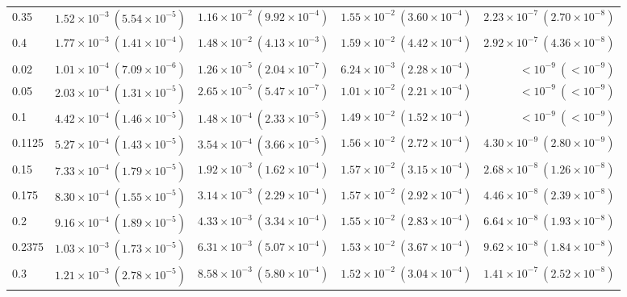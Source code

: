 \begin{table}[htbp]
\begin{tabular}{@{} l rrrr @{}}
0.35 & $1.52\!\times\!10^{-3}\ (5.54\!\times\!10^{-5})$ & $1.16\!\times\!10^{-2}\ (9.92\!\times\!10^{-4})$ & $1.55\!\times\!10^{-2}\ (3.60\!\times\!10^{-4})$ & $2.23\!\times\!10^{-7}\ (2.70\!\times\!10^{-8})$ \\
0.4 & $1.77\!\times\!10^{-3}\ (1.41\!\times\!10^{-4})$ & $1.48\!\times\!10^{-2}\ (4.13\!\times\!10^{-3})$ & $1.59\!\times\!10^{-2}\ (4.42\!\times\!10^{-4})$ & $2.92\!\times\!10^{-7}\ (4.36\!\times\!10^{-8})$ \\
\addlinespace
\multicolumn{5}{@{}l}{\textit{Medium ($p \sim \mathcal{U}(0.1125, 0.2375)$)}} \\
0.02 & $1.01\!\times\!10^{-4}\ (7.09\!\times\!10^{-6})$ & $1.26\!\times\!10^{-5}\ (2.04\!\times\!10^{-7})$ & $6.24\!\times\!10^{-3}\ (2.28\!\times\!10^{-4})$ & $<\!10^{-9}\ (<\!10^{-9})$ \\
0.05 & $2.03\!\times\!10^{-4}\ (1.31\!\times\!10^{-5})$ & $2.65\!\times\!10^{-5}\ (5.47\!\times\!10^{-7})$ & $1.01\!\times\!10^{-2}\ (2.21\!\times\!10^{-4})$ & $<\!10^{-9}\ (<\!10^{-9})$ \\
0.1 & $4.42\!\times\!10^{-4}\ (1.46\!\times\!10^{-5})$ & $1.48\!\times\!10^{-4}\ (2.33\!\times\!10^{-5})$ & $1.49\!\times\!10^{-2}\ (1.52\!\times\!10^{-4})$ & $<\!10^{-9}\ (<\!10^{-9})$ \\
0.1125 & $5.27\!\times\!10^{-4}\ (1.43\!\times\!10^{-5})$ & $3.54\!\times\!10^{-4}\ (3.66\!\times\!10^{-5})$ & $1.56\!\times\!10^{-2}\ (2.72\!\times\!10^{-4})$ & $4.30\!\times\!10^{-9}\ (2.80\!\times\!10^{-9})$ \\
0.15 & $7.33\!\times\!10^{-4}\ (1.79\!\times\!10^{-5})$ & $1.92\!\times\!10^{-3}\ (1.62\!\times\!10^{-4})$ & $1.57\!\times\!10^{-2}\ (3.15\!\times\!10^{-4})$ & $2.68\!\times\!10^{-8}\ (1.26\!\times\!10^{-8})$ \\
0.175 & $8.30\!\times\!10^{-4}\ (1.55\!\times\!10^{-5})$ & $3.14\!\times\!10^{-3}\ (2.29\!\times\!10^{-4})$ & $1.57\!\times\!10^{-2}\ (2.92\!\times\!10^{-4})$ & $4.46\!\times\!10^{-8}\ (2.39\!\times\!10^{-8})$ \\
0.2 & $9.16\!\times\!10^{-4}\ (1.89\!\times\!10^{-5})$ & $4.33\!\times\!10^{-3}\ (3.34\!\times\!10^{-4})$ & $1.55\!\times\!10^{-2}\ (2.83\!\times\!10^{-4})$ & $6.64\!\times\!10^{-8}\ (1.93\!\times\!10^{-8})$ \\
0.2375 & $1.03\!\times\!10^{-3}\ (1.73\!\times\!10^{-5})$ & $6.31\!\times\!10^{-3}\ (5.07\!\times\!10^{-4})$ & $1.53\!\times\!10^{-2}\ (3.67\!\times\!10^{-4})$ & $9.62\!\times\!10^{-8}\ (1.84\!\times\!10^{-8})$ \\
0.3 & $1.21\!\times\!10^{-3}\ (2.78\!\times\!10^{-5})$ & $8.58\!\times\!10^{-3}\ (5.80\!\times\!10^{-4})$ & $1.52\!\times\!10^{-2}\ (3.04\!\times\!10^{-4})$ & $1.41\!\times\!10^{-7}\ (2.52\!\times\!10^{-8})$ \\

\end{tabular}
\end{table}
